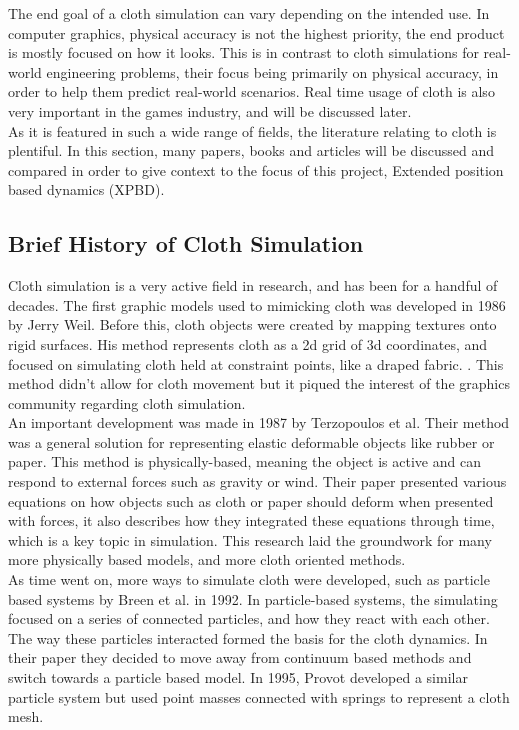 \documentclass[12pt,a4paper]{article}
\begin{document}
The end goal of a cloth simulation can vary depending on the intended use. In computer graphics, physical accuracy is not the highest priority, the end product is mostly focused on how it looks. This is in contrast to cloth simulations for real-world engineering problems, their focus being primarily on physical accuracy, in order to help them predict real-world scenarios. Real time usage of cloth is also very important in the games industry, and will be discussed later. \\

As it is featured in such a wide range of fields, the literature relating to cloth is plentiful. In this section, many papers, books and articles will be discussed and compared in order to give context to the focus of this project, Extended position based dynamics (XPBD).

\subsection{Brief History of Cloth Simulation}
\label{History}
Cloth simulation is a very active field in research, and has been for a handful of decades. The first graphic models used to mimicking cloth was developed in 1986 by Jerry Weil. Before this, cloth objects were created by mapping textures onto rigid surfaces. His method represents cloth as a 2d grid of 3d coordinates, and focused on simulating cloth held at constraint points, like a draped fabric. \cite{weil_synthesis_1986}. This method didn't allow for cloth movement but it piqued the interest of the graphics community regarding cloth simulation. \\

An important development was made in 1987 by Terzopoulos et al. Their method was a general solution for representing elastic deformable objects like rubber or paper. This method is physically-based, meaning the object is active and can respond to external forces such as gravity or wind. Their paper presented various equations on how objects such as cloth or paper should deform when presented with forces, it also describes how they integrated these equations through time, which is a key topic in simulation. This research laid the groundwork for many more physically based models, and more cloth oriented methods. \cite{terzopoulos1987elastically} \\

As time went on, more ways to simulate cloth were developed, such as particle based systems by Breen et al. in 1992. In particle-based systems, the simulating focused on a series of connected particles, and how they react with each other. The way these particles interacted formed the basis for the cloth dynamics. \cite{breen1992physically} In their paper they decided to move away from continuum based methods and switch towards a particle based model. In 1995, Provot developed a similar particle system but used point masses connected with springs to represent a cloth mesh. \cite{provot1995deformation} \\
\end{document}
